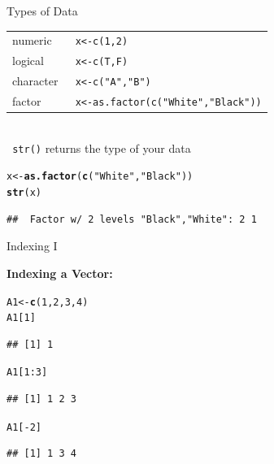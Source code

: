 \documentclass[11pt,german,hideothersubsections]{beamer}\usepackage[]{graphicx}\usepackage[]{color}
\makeatletter
\newcommand{\hlnum}[1]{\textcolor[rgb]{0.686,0.059,0.569}{#1}}%
\newcommand{\hlstr}[1]{\textcolor[rgb]{0.192,0.494,0.8}{#1}}%
\newcommand{\hlopt}[1]{\textcolor[rgb]{0,0,0}{#1}}%
\newcommand{\hlstd}[1]{\textcolor[rgb]{0.345,0.345,0.345}{#1}}%
\newcommand{\hlkwb}[1]{\textcolor[rgb]{0.69,0.353,0.396}{#1}}%
\newcommand{\hlkwd}[1]{\textcolor[rgb]{0.737,0.353,0.396}{\textbf{#1}}}%
\newenvironment{kframe}{%
 \def\at@end@of@kframe{}%
 \ifinner\ifhmode%
  \def\at@end@of@kframe{\end{minipage}}%
  \begin{minipage}{\columnwidth}%
 \fi\fi%
 \def\FrameCommand##1{\hskip\@totalleftmargin \hskip-\fboxsep
 \colorbox{shadecolor}{##1}\hskip-\fboxsep
     \hskip-\linewidth \hskip-\@totalleftmargin \hskip\columnwidth}%
 \MakeFramed {\advance\hsize-\width
   \@totalleftmargin\z@ \linewidth\hsize
   \@setminipage}}%
 {\par\unskip\endMakeFramed%
 \at@end@of@kframe}
\newenvironment{knitrout}{}{} %
\newcommand{\R}[1]{{\tt \color{blue}  #1}}
\makeatother
\begin{document}
\begin{frame}[fragile]{Types of Data}
\begin{tabular}{l l}
numeric & \R{x<-c(1,2)}\\
logical & \R{x<-c(T,F)}\\
character & \R{x<-c("A","B")}\\
factor & \R{x<-as.factor(c("White","Black"))}\\
\end{tabular}\\
\vspace{.25cm}
\R{str()} returns the type of your data
\begin{knitrout}
\color{fgcolor}\begin{kframe}
\begin{alltt}
\hlstd{x}\hlkwb{<-}\hlkwd{as.factor}\hlstd{(}\hlkwd{c}\hlstd{(}\hlstr{"White"}\hlstd{,}\hlstr{"Black"}\hlstd{))}
\hlkwd{str}\hlstd{(x)}
\end{alltt}
\begin{verbatim}
##  Factor w/ 2 levels "Black","White": 2 1
\end{verbatim}
\end{kframe}
\end{knitrout}
\end{frame}
\begin{frame}[fragile]{Indexing I}
\begin{center}
\textbf{Indexing a Vector:}
\end{center}
\begin{knitrout}
\color{fgcolor}\begin{kframe}
\begin{alltt}
\hlstd{A1}\hlkwb{<-}\hlkwd{c}\hlstd{(}\hlnum{1}\hlstd{,}\hlnum{2}\hlstd{,}\hlnum{3}\hlstd{,}\hlnum{4}\hlstd{)}
\hlstd{A1[}\hlnum{1}\hlstd{]}
\end{alltt}
\begin{verbatim}
## [1] 1
\end{verbatim}
\begin{alltt}
\hlstd{A1[}\hlnum{1}\hlopt{:}\hlnum{3}\hlstd{]}
\end{alltt}
\begin{verbatim}
## [1] 1 2 3
\end{verbatim}
\begin{alltt}
\hlstd{A1[}\hlopt{-}\hlnum{2}\hlstd{]}
\end{alltt}
\begin{verbatim}
## [1] 1 3 4
\end{verbatim}
\end{kframe}
\end{knitrout}
\end{frame}
\end{document}
